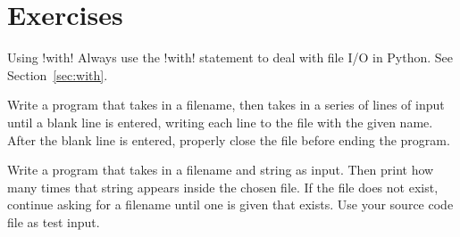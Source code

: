\documentclass[11pt]{cselabheader}
\begin{document}
\pagebreak
\section{Exercises}
\label{sec:ex}

\begin{warningbox}{Using \protect\pythoninline!with!}
  Always use the \pythoninline!with! statement to deal with file I/O in Python.
  See Section~\ref{sec:with}.
\end{warningbox}

\begin{ex}[save.py] Write a program that takes in a filename, then takes in
  a series of lines of input until a blank line is entered, writing each line to
  the file with the given name. After the blank line is entered, properly close
  the file before ending the program.
\end{ex}

\begin{ex} Write a program that
  takes in a filename and string as input. Then print how many times that string
  appears inside the chosen file. If the file does not exist, continue asking
  for a filename until one is given that exists. Use your source code file as
  test input.
\end{ex}
\end{document}
